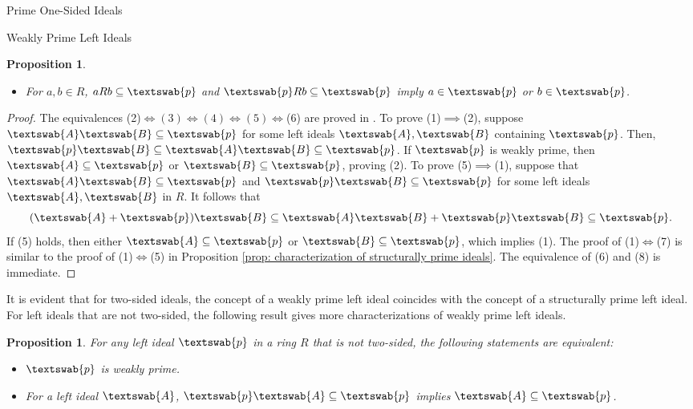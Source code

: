 \documentclass[11pt,a4paper]{article}
\theoremstyle{theorem}
\newtheorem{proposition}[theorem]{Proposition}
\numberwithin{equation}{section}
\begin{document}
\begin{section}{Prime One-Sided Ideals}
\begin{subsection}{Weakly Prime Left Ideals}
\begin{proposition}
\begin{itemize}
			\item[(8)] For \( a,b\in R\), \(aRb\subseteq \textswab{p}\) and \(\textswab{p}Rb\subseteq \textswab{p}\) imply \( a\in \textswab{p} \) or \( b\in   \textswab{p} \).
		\end{itemize}
	\end{proposition}
	\begin{proof}
		The equivalences (2)\(\iff (3) \iff (4) \iff (5) \iff \)(6) are proved in \cite[Proposition 1.1]{van1985weakly}. To prove (1)\(\implies \)(2), suppose  \( \textswab{A}\textswab{B}\subseteq\textswab{p}\) for some left ideals \( \textswab{A},\textswab{B}\) containing \(\textswab{p}\). Then, \( \textswab{p}\textswab{B}\subseteq \textswab{A}\textswab{B}\subseteq\textswab{p}\). If  \( \textswab{p} \) is weakly prime, then \( \textswab{A}\subseteq\textswab{p}\) or \( \textswab{B}\subseteq\textswab{p}\), proving (2). To prove (5)\(\implies \)(1), suppose that  \( \textswab{A}\textswab{B}\subseteq\textswab{p}\) and \( \textswab{p}\textswab{B}\subseteq\textswab{p}\) for some left ideals \( \textswab{A},\textswab{B}\) in \(R\). It follows that 
		\[
			(\textswab{A}+\textswab{p})\textswab{B} \subseteq \textswab{A}\textswab{B}+\textswab{p}\textswab{B} \subseteq \textswab{p}. 	
		\]
		If (5) holds, then either  \( \textswab{A} \subseteq \textswab{p} \) or \( \textswab{B} \subseteq \textswab{p} \), which implies (1). The proof of (1)\(\iff\)(7) is similar to the proof of (1)\(\iff\)(5) in Proposition \ref{prop: characterization of structurally prime ideals}.   The equivalence of (6) and (8) is immediate. 
	\end{proof}
	
	It is evident that  for two-sided ideals, the concept of a weakly prime left ideal coincides with the concept of a structurally prime left ideal. For left ideals that are not two-sided, the following result gives more characterizations of weakly prime left ideals. 
	
	\begin{proposition}\label{prop: characterization of weakly prime left ideals (not two-sided)}
		For any left ideal \( \textswab{p}\) in a ring \( R \) that is not two-sided, the following statements are equivalent:
		\begin{itemize}
			\item[(1)] \( \textswab{p} \) is weakly prime.
			
			\item[(2)]  For a left ideal \( \textswab{A} \),  \( \textswab{p}\textswab{A} \subseteq \textswab{p} \) implies \( \textswab{A} \subseteq \textswab{p} \).
			

\end{itemize}
\end{proposition}
\end{subsection}
\end{section}
\end{document}
